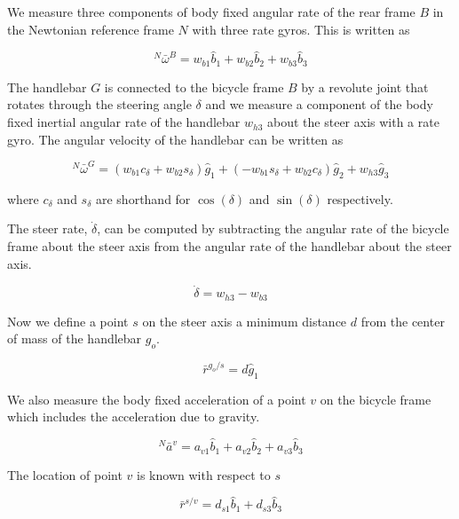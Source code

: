 \documentclass[a4paper]{article}
\begin{document}
We measure three components of body fixed angular rate of the rear frame $B$
in the Newtonian reference frame $N$ with three rate gyros. This is written as

\begin{equation} ^N\bar{\omega}^B = w_{b1}\hat{b}_1 + w_{b2}\hat{b}_2 +
  w_{b3}\hat{b}_3
  \label{eq:rear-frame-angular-rate}
\end{equation}

The handlebar $G$ is connected to the bicycle frame $B$ by a revolute joint
that rotates through the steering angle $\delta$ and we measure a component
of the body fixed inertial angular rate of the handlebar $w_{h3}$ about the steer axis
with a rate gyro. The angular velocity of the handlebar can be written as


\begin{equation}
  ^N\bar{\omega}^G = (w_{b1}c_\delta + w_{b2}s_\delta)\hat{g}_1 +
  (-w_{b1}s_\delta + w_{b2}c_\delta)\hat{g}_2 +
  w_{h3}\hat{g}_3
\end{equation}

where $c_\delta$ and $s_\delta$ are shorthand for $\operatorname{cos}(\delta)$
and $\operatorname{sin}(\delta)$ respectively.

The steer rate, $\dot{\delta}$, can be computed by subtracting the angular rate
of the bicycle frame about the steer axis from the angular rate of the
handlebar about the steer axis.

\begin{equation}
  \dot{\delta} = w_{h3} - w_{b3}
\end{equation}

Now we define a point $s$ on the steer axis a minimum distance $d$ from the
center of mass of the handlebar $g_o$.

\begin{equation}
  \bar{r}^{g_o/s} = d\hat{g}_1
\end{equation}

We also measure the body fixed acceleration of a point $v$ on the bicycle
frame which includes the acceleration due to gravity.

\begin{equation}
  ^N\bar{a}^v = a_{v1}\hat{b}_1 + a_{v2}\hat{b}_2 + a_{v3}\hat{b}_3
\end{equation}

The location of point $v$ is known with respect to $s$

\begin{equation}
  \bar{r}^{s/v} = d_{s1}\hat{b}_1 + d_{s3}\hat{b}_3
\end{equation}
\end{document}
